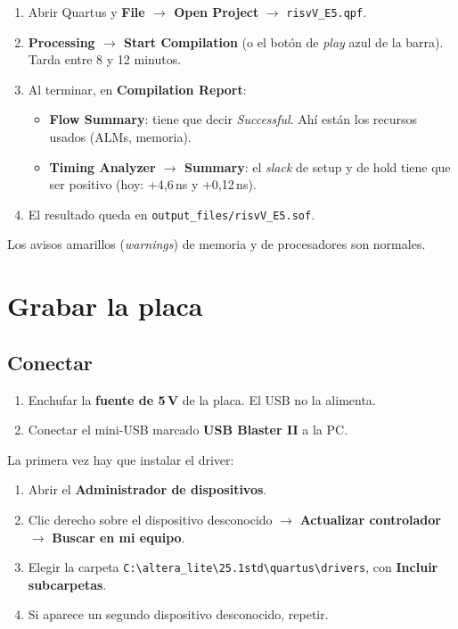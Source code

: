 \documentclass[11pt,a4paper]{article}
\newcommand{\code}[1]{\texttt{#1}}
\newcommand{\menu}[1]{\textsf{\textbf{#1}}}
\begin{document}
\begin{enumerate}
\item Abrir Quartus y \menu{File $\to$ Open Project} $\to$ \code{risvV\_E5.qpf}.
\item \menu{Processing $\to$ Start Compilation} (o el botón de \emph{play} azul de la barra). Tarda entre 8 y 12 minutos.
\item Al terminar, en \menu{Compilation Report}:
  \begin{itemize}
  \item \menu{Flow Summary}: tiene que decir \emph{Successful}. Ahí están los recursos usados (ALMs, memoria).
  \item \menu{Timing Analyzer $\to$ Summary}: el \emph{slack} de setup y de hold tiene que ser positivo (hoy: +4,6\,ns y +0,12\,ns).
  \end{itemize}
\item El resultado queda en \code{output\_files/risvV\_E5.sof}.
\end{enumerate}

Los avisos amarillos (\emph{warnings}) de memoria y de procesadores son normales.

\section{Grabar la placa}

\subsection{Conectar}\label{sec:driver}
\begin{enumerate}
\item Enchufar la \textbf{fuente de 5\,V} de la placa. El USB no la alimenta.
\item Conectar el mini-USB marcado \textbf{USB Blaster II} a la PC.
\end{enumerate}

La primera vez hay que instalar el driver:
\begin{enumerate}
\item Abrir el \menu{Administrador de dispositivos}.
\item Clic derecho sobre el dispositivo desconocido $\to$ \menu{Actualizar controlador} $\to$ \menu{Buscar en mi equipo}.
\item Elegir la carpeta \code{C:\textbackslash altera\_lite\textbackslash 25.1std\textbackslash quartus\textbackslash drivers}, con \menu{Incluir subcarpetas}.
\item Si aparece un segundo dispositivo desconocido, repetir.
\end{enumerate}
\end{document}
